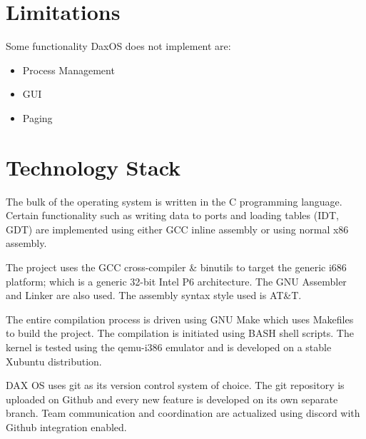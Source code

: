 \section{Limitations} \label{section:Limitations}
Some functionality DaxOS does not implement are:
\begin{itemize}
	\item Process Management
	\item GUI
	\item Paging
\end{itemize}

\section{Technology Stack} \label{section:Technology Stack}
The bulk of the operating system is written in the C programming language.
Certain functionality such as writing data to ports and loading tables (IDT, GDT) are implemented using either GCC inline assembly or using normal x86 assembly.

\vspace{0.3cm}
The project uses the GCC cross-compiler \& binutils to target the generic i686 platform; which is a generic 32-bit Intel P6 architecture.
The GNU Assembler and Linker are also used. The assembly syntax style used is AT\&T.

\vspace{0.3cm}
The entire compilation process is driven using GNU Make which uses Makefiles to build the project.
The compilation is initiated using BASH shell scripts.
The kernel is tested using the qemu-i386 emulator and is developed on a stable Xubuntu distribution. 

\pagebreak
DAX OS uses git as its version control system of choice.
The git repository is uploaded on Github and every new feature is developed on its own separate branch.
Team communication and coordination are actualized using discord with Github integration enabled.


